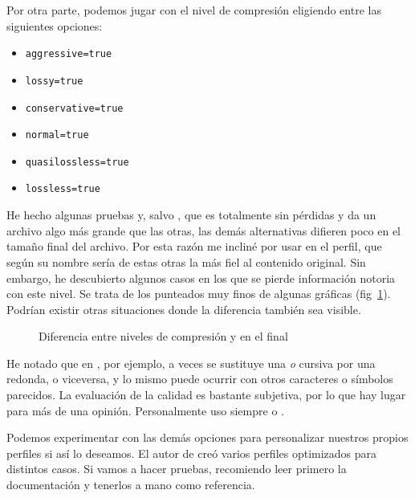 \documentclass[%
	a5paper,
	10pt,
	twoside,
	openright,
	final,
]{memoir}
\begin{document}
	Por otra parte, podemos jugar con el nivel de compresión eligiendo entre las siguientes opciones:
	\begin{itemize}[noitemsep]
		\item \texttt{aggressive=true}
		\item \texttt{lossy=true}
		\item \texttt{conservative=true}
		\item \texttt{normal=true}
		\item \texttt{quasilossless=true}
		\item \texttt{lossless=true}
	\end{itemize}

	He hecho algunas pruebas y, salvo , que es totalmente sin pérdidas y da un archivo algo más grande que las otras, las demás alternativas difieren poco en el tamaño final del archivo. Por esta razón me incliné por usar  en el perfil, que según su nombre sería de estas otras la más fiel al contenido original. Sin embargo, he descubierto algunos casos en los que se pierde información notoria con este nivel. Se trata de los punteados muy finos de algunas gráficas (fig~\ref{fig:djvuSmallProfiles}). Podrían existir otras situaciones donde la diferencia también sea visible.

	\begin{figure}
		\caption[Diferencia entre niveles de compresión en el \djvu final]{Diferencia entre niveles de compresión  y  en el \djvu final\label{fig:djvuSmallProfiles}}
	\end{figure}

	He notado que en , por ejemplo, a veces se sustituye una \textit{o} cursiva por una redonda, o viceversa, y lo mismo puede ocurrir con otros caracteres o símbolos parecidos. La evaluación de la calidad es bastante subjetiva, por lo que hay lugar para más de una opinión. Personalmente uso siempre  o .

	Podemos experimentar con las demás opciones para personalizar nuestros propios perfiles si así lo deseamos. El autor de \djvusmallmod creó varios perfiles optimizados para distintos casos. Si vamos a hacer pruebas, recomiendo leer primero la documentación y tenerlos a mano como referencia.
\end{document}
